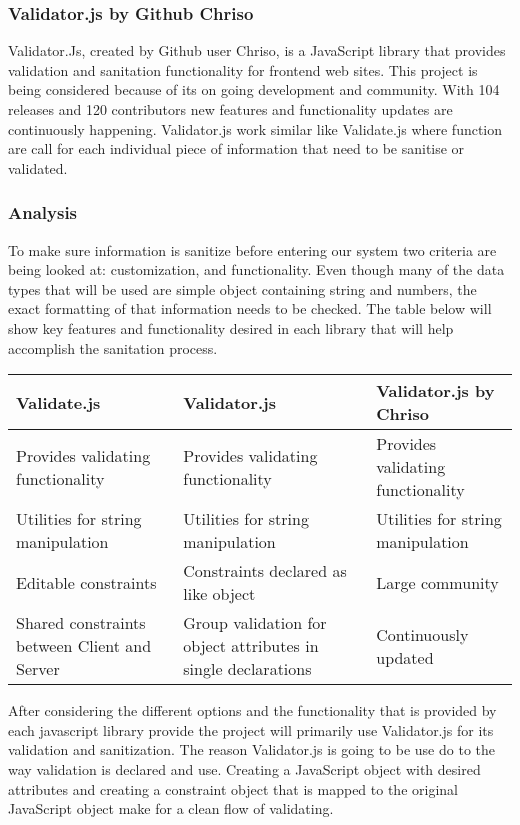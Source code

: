 \documentclass[letterpaper,10pt,titlepage, onecolumn, compsoc]{IEEEtran}
\begin{document}
\subsubsection{Validator.js by Github Chriso}
Validator.Js, created by Github user Chriso, is a JavaScript library that provides validation and sanitation functionality for frontend web sites. This project is being considered because of its on going development and community. With 104 releases and 120 contributors new features and functionality updates are continuously happening. Validator.js work similar like Validate.js where function are call for each individual piece of information that need to be sanitise or validated. \cite{chriso2016}


\subsubsection{Analysis}
To make sure information is sanitize before entering our system two criteria are being looked at: customization, and functionality. Even though many of the data types that will be used are simple object containing string and numbers, the exact formatting of that information needs to be checked. The table below will show key features and functionality desired in each library that will help accomplish the sanitation process.

\begin{center}
\begin{tabular}{|p{4.25cm}|p{4.25cm}|p{4.25cm}|}
\hline
\textbf{Validate.js}& \textbf{Validator.js}& \textbf{Validator.js by Chriso}   
\\ \hline
Provides validating functionality            & Provides validating functionality                             & Provides validating functionality 
\\ \hline
Utilities for string manipulation            & Utilities for string manipulation                             & Utilities for string manipulation 
\\ \hline
Editable constraints                         & Constraints declared as like object                           & Large community                   
\\ \hline
Shared constraints between Client and Server & Group validation for object attributes in single declarations & Continuously updated              
\\ \hline
\end{tabular}
\end{center}
After considering the different options and the functionality that is provided by each javascript library provide the project will primarily use Validator.js for its validation and sanitization. The reason Validator.js is going to be use do to the way validation is declared and use. Creating a JavaScript object with desired attributes and creating a constraint object that is mapped to the original JavaScript object make for a clean flow of validating.
\end{document}
